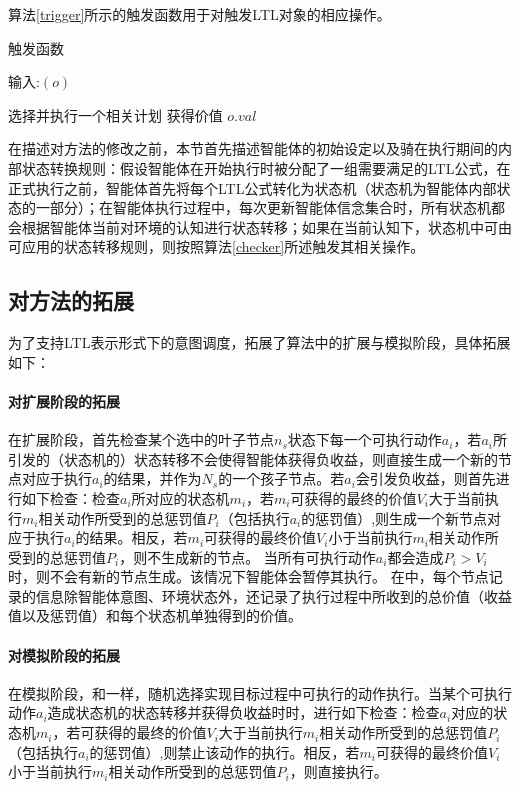 算法\ref{trigger}所示的触发函数用于对触发LTL对象的相应操作。
\begin{algorithm} %
\caption{触发函数}\label{trigger}
\begin{algorithmic}[1]
\STATE 输入:$(o)$

\STATE 选择并执行一个相关计划
\ELSE
{}
\STATE 获得价值 $o.val$
\ENDIF
\ENDIF

\end{algorithmic}
\end{algorithm}

在描述对\SA 方法的修改之前，本节首先描述智能体的初始设定以及骑在执行期间的内部状态转换规则：假设智能体在开始执行时被分配了一组需要满足的LTL公式，在正式执行之前，智能体首先将每个LTL公式转化为状态机（状态机为智能体内部状态的一部分）；在智能体执行过程中，每次更新智能体信念集合时，所有状态机都会根据智能体当前对环境的认知进行状态转移；如果在当前认知下，状态机中可由可应用的状态转移规则，则按照算法\ref{checker}所述触发其相关操作。

\subsection{对\SA 方法的拓展}
为了支持LTL表示形式下的意图调度，\SAT 拓展了\SA 算法中的扩展与模拟阶段，具体拓展如下：
\paragraph{对扩展阶段的拓展}
在扩展阶段，\SAT 首先检查某个选中的叶子节点$n_s$状态下每一个可执行动作$a_i$，若$a_i$所引发的（状态机的）状态转移不会使得智能体获得负收益，则直接生成一个新的节点对应于执行$a_i$的结果，并作为$N_s$的一个孩子节点。若$a_i$会引发负收益，则首先进行如下检查：检查$a_i$所对应的状态机$m_i$，若$m_i$可获得的最终的价值$V_i$大于当前执行$m_i$相关动作所受到的总惩罚值$P_i$（包括执行$a_i$的惩罚值）,则生成一个新节点对应于执行$a_i$的结果。相反，若$m_i$可获得的最终价值$V_i$小于当前执行$m_i$相关动作所受到的总惩罚值$P_i$，则不生成新的节点。
%
当所有可执行动作$a_i$都会造成$P_i > V_i$时，则不会有新的节点生成。该情况下智能体会暂停其执行。
%
在\SAT 中，每个节点记录的信息除智能体意图、环境状态外，还记录了执行过程中所收到的总价值（收益值以及惩罚值）和每个状态机单独得到的价值。

\paragraph{对模拟阶段的拓展}
在模拟阶段，\SAT 和\SA 一样，随机选择实现目标过程中可执行的动作执行。当某个可执行动作$a_i$造成状态机的状态转移并获得负收益时时，进行如下检查：检查$a_i$对应的状态机$m_i$，若可获得的最终的价值$V_i$大于当前执行$m_i$相关动作所受到的总惩罚值$P_i$（包括执行$a_i$的惩罚值）,则禁止该动作的执行。相反，若$m_i$可获得的最终价值$V_i$小于当前执行$m_i$相关动作所受到的总惩罚值$P_i$，则直接执行。

